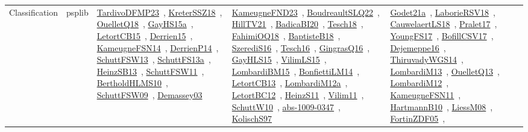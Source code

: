 {\begin{longtable}{lp{3cm}>{\raggedright\arraybackslash}p{6cm}>{\raggedright\arraybackslash}p{6cm}>{\raggedright\arraybackslash}p{8cm}}
Classification & psplib & \href{works/TardivoDFMP23.pdf}{TardivoDFMP23}~\cite{TardivoDFMP23}, \href{works/KreterSSZ18.pdf}{KreterSSZ18}~\cite{KreterSSZ18}, \href{works/OuelletQ18.pdf}{OuelletQ18}~\cite{OuelletQ18}, \href{works/GayHS15a.pdf}{GayHS15a}~\cite{GayHS15a}, \href{works/LetortCB15.pdf}{LetortCB15}~\cite{LetortCB15}, \href{works/Derrien15.pdf}{Derrien15}~\cite{Derrien15}, \href{works/KameugneFSN14.pdf}{KameugneFSN14}~\cite{KameugneFSN14}, \href{works/DerrienP14.pdf}{DerrienP14}~\cite{DerrienP14}, \href{works/SchuttFSW13.pdf}{SchuttFSW13}~\cite{SchuttFSW13}, \href{works/SchuttFS13a.pdf}{SchuttFS13a}~\cite{SchuttFS13a}, \href{works/HeinzSB13.pdf}{HeinzSB13}~\cite{HeinzSB13}, \href{works/SchuttFSW11.pdf}{SchuttFSW11}~\cite{SchuttFSW11}, \href{works/BertholdHLMS10.pdf}{BertholdHLMS10}~\cite{BertholdHLMS10}, \href{works/SchuttFSW09.pdf}{SchuttFSW09}~\cite{SchuttFSW09}, \href{works/Demassey03.pdf}{Demassey03}~\cite{Demassey03} & \href{works/KameugneFND23.pdf}{KameugneFND23}~\cite{KameugneFND23}, \href{works/BoudreaultSLQ22.pdf}{BoudreaultSLQ22}~\cite{BoudreaultSLQ22}, \href{works/HillTV21.pdf}{HillTV21}~\cite{HillTV21}, \href{works/BadicaBI20.pdf}{BadicaBI20}~\cite{BadicaBI20}, \href{works/Tesch18.pdf}{Tesch18}~\cite{Tesch18}, \href{works/FahimiOQ18.pdf}{FahimiOQ18}~\cite{FahimiOQ18}, \href{works/BaptisteB18.pdf}{BaptisteB18}~\cite{BaptisteB18}, \href{works/SzerediS16.pdf}{SzerediS16}~\cite{SzerediS16}, \href{works/Tesch16.pdf}{Tesch16}~\cite{Tesch16}, \href{works/GingrasQ16.pdf}{GingrasQ16}~\cite{GingrasQ16}, \href{works/GayHLS15.pdf}{GayHLS15}~\cite{GayHLS15}, \href{works/VilimLS15.pdf}{VilimLS15}~\cite{VilimLS15}, \href{works/LombardiBM15.pdf}{LombardiBM15}~\cite{LombardiBM15}, \href{works/BonfiettiLM14.pdf}{BonfiettiLM14}~\cite{BonfiettiLM14}, \href{works/LetortCB13.pdf}{LetortCB13}~\cite{LetortCB13}, \href{works/LombardiM12a.pdf}{LombardiM12a}~\cite{LombardiM12a}, \href{works/LetortBC12.pdf}{LetortBC12}~\cite{LetortBC12}, \href{works/HeinzS11.pdf}{HeinzS11}~\cite{HeinzS11}, \href{works/Vilim11.pdf}{Vilim11}~\cite{Vilim11}, \href{works/SchuttW10.pdf}{SchuttW10}~\cite{SchuttW10}, \href{works/abs-1009-0347.pdf}{abs-1009-0347}~\cite{abs-1009-0347}, \href{works/KolischS97.pdf}{KolischS97}~\cite{KolischS97} & \href{works/Godet21a.pdf}{Godet21a}~\cite{Godet21a}, \href{works/LaborieRSV18.pdf}{LaborieRSV18}~\cite{LaborieRSV18}, \href{works/CauwelaertLS18.pdf}{CauwelaertLS18}~\cite{CauwelaertLS18}, \href{works/Pralet17.pdf}{Pralet17}~\cite{Pralet17}, \href{works/YoungFS17.pdf}{YoungFS17}~\cite{YoungFS17}, \href{works/BofillCSV17.pdf}{BofillCSV17}~\cite{BofillCSV17}, \href{works/Dejemeppe16.pdf}{Dejemeppe16}~\cite{Dejemeppe16}, \href{works/ThiruvadyWGS14.pdf}{ThiruvadyWGS14}~\cite{ThiruvadyWGS14}, \href{works/LombardiM13.pdf}{LombardiM13}~\cite{LombardiM13}, \href{works/OuelletQ13.pdf}{OuelletQ13}~\cite{OuelletQ13}, \href{works/LombardiM12.pdf}{LombardiM12}~\cite{LombardiM12}, \href{works/KameugneFSN11.pdf}{KameugneFSN11}~\cite{KameugneFSN11}, \href{works/HartmannB10.pdf}{HartmannB10}~\cite{HartmannB10}, \href{works/LiessM08.pdf}{LiessM08}~\cite{LiessM08}, \href{works/FortinZDF05.pdf}{FortinZDF05}~\cite{FortinZDF05}, 
\end{longtable}}
